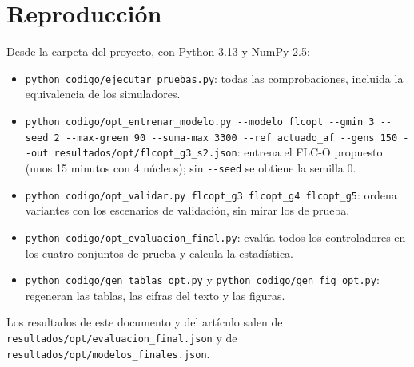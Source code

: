 \documentclass[journal]{IEEEtran}
\newcommand{\FLC}{FLC-O}
\begin{document}


\section{Reproducción}
\label{sec:s-repro}
Desde la carpeta del proyecto, con Python 3.13 y NumPy 2.5:
\begin{itemize}
\item \texttt{python codigo/ejecutar\_pruebas.py}: todas las comprobaciones, incluida la equivalencia de los simuladores.
\item \texttt{python codigo/opt\_entrenar\_modelo.py -{}-modelo flcopt -{}-gmin 3 -{}-seed 2 -{}-max-green 90 -{}-suma-max 3300 -{}-ref actuado\_af -{}-gens 150 -{}-out resultados/opt/flcopt\_g3\_s2.json}: entrena el \FLC{} propuesto (unos 15 minutos con 4 núcleos); sin \texttt{-{}-seed} se obtiene la semilla 0.
\item \texttt{python codigo/opt\_validar.py flcopt\_g3 flcopt\_g4 flcopt\_g5}: ordena variantes con los escenarios de validación, sin mirar los de prueba.
\item \texttt{python codigo/opt\_evaluacion\_final.py}: evalúa todos los controladores en los cuatro conjuntos de prueba y calcula la estadística.
\item \texttt{python codigo/gen\_tablas\_opt.py} y \texttt{python codigo/gen\_fig\_opt.py}: regeneran las tablas, las cifras del texto y las figuras.
\end{itemize}
Los resultados de este documento y del artículo salen de \texttt{resultados/opt/evaluacion\_final.json} y de \texttt{resultados/opt/modelos\_finales.json}.



\end{document}
